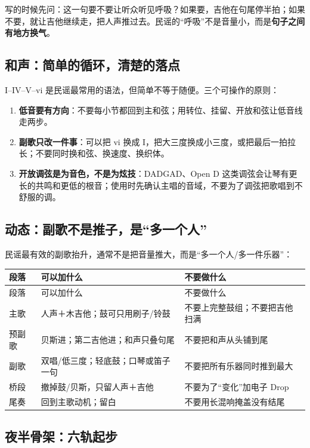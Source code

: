 写的时候先问：这一句要不要让听众听见呼吸？如果要，吉他在句尾停半拍；如果不要，就让吉他继续走，把人声推过去。民谣的“呼吸”不是音量小，而是\textbf{句子之间有地方换气}。

\subsection{和声：简单的循环，清楚的落点}
\label{sec:folk-harmony}

I–IV–V–vi 是民谣最常用的语法，但简单不等于随便。三个可操作的原则：

\begin{enumerate}
\item \textbf{低音要有方向}：不要每小节都回到主和弦；用转位、挂留、开放和弦让低音线走两步。
\item \textbf{副歌只改一件事}：可以把 vi 换成 I，把大三度换成小三度，或把最后一拍拉长；不要同时换和弦、换速度、换织体。
\item \textbf{开放调弦是为音色，不是为炫技}：DADGAD、Open D 这类调弦会让琴有更长的共鸣和更低的根音；使用时先确认主唱的音域，不要为了调弦把歌唱到不舒服的调。
\end{enumerate}

\subsection{动态：副歌不是推子，是“多一个人”}
\label{sec:folk-dynamic}

民谣最有效的副歌抬升，通常不是把音量推大，而是“多一个人/多一件乐器”：

\begin{longtable}{p{}p{}p{}}
\toprule
段落 & 可以加什么 & 不要做什么 \\
\midrule
\endfirsthead
\toprule
段落 & 可以加什么 & 不要做什么 \\
\midrule
\endhead
主歌 & 人声＋木吉他；鼓可只用刷子/铃鼓 & 不要上完整鼓组；不要把吉他扫满 \\
预副歌 & 贝斯进；第二吉他进；和声只叠句尾 & 不要把和声从头铺到尾 \\
副歌 & 双唱/低三度；轻底鼓；口琴或笛子一句 & 不要把所有乐器同时推到最大 \\
桥段 & 撤掉鼓/贝斯，只留人声＋吉他 & 不要为了“变化”加电子 Drop \\
尾奏 & 回到主歌动机；留白 & 不要用长混响掩盖没有结尾 \\
\bottomrule
\end{longtable}

\subsection{夜半骨架：六轨起步}
\label{sec:folk-yeban}

